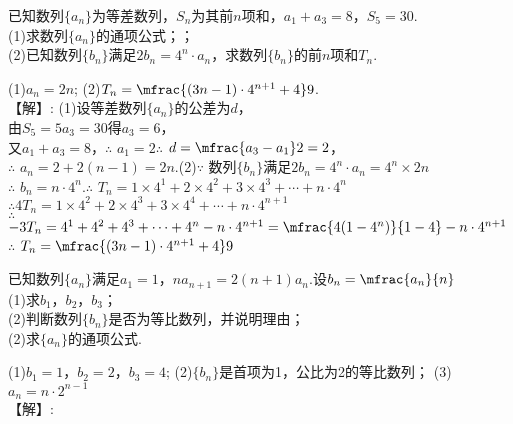 \begin{exercise}
\begin{multicols}{2}
    \end{multicols}
    \clearpage
    \item %
      已知数列$\{a_n\}$为等差数列，$S_n$为其前$n$项和，$a_1+a_3=8$，$S_5=30$.\\
      (1)求数列$\{a_n\}$的通项公式；；\\
      (2)已知数列$\{b_n\}$满足$2b_n=4^n\cdot a_n$，求数列$\{b_n\}$的前$n$项和$T_n$.
      \begin{answer}
        (1)$a_n=2n$;
        (2)$T_n=\mfrac{(3n-1)\cdot4^{n+1}+4}9$.
        \\【解】:
        (1)设等差数列$\{a_n\}$的公差为$d$，\\
           由$S_5=5a_3=30$得$a_3=6$，\\
           又$a_1+a_3=8$，$\therefore$ $a_1=2$\fz[3]
           $\therefore$ $d=\mfrac{a_3-a_1}2=2$，\\
           $\therefore$ $a_n=2+2(n-1)=2n$.\fz[6]
        (2)$\because$ 数列$\{b_n\}$满足$2b_n=4^n\cdot a_n=4^n\times2n$\\
           $\therefore$ $b_n=n\cdot 4^n$.\fz[8]
           $\therefore$ $T_n=1\times4^1+2\times4^2+3\times4^3+\cdots+n\cdot4^n$\\
            $\therefore$$4T_n=1\times4^2+2\times4^3+3\times4^4+\cdots+n\cdot4^{n+1}$\\
           $\therefore$ $-3T_n=4^1+4^2+4^3+\cdots+4^n-n\cdot4^{n+1}=\mfrac{4(1-4^n)}{1-4}-n\cdot4^{n+1}$\fz[10]
           $\therefore$ $T_n=\mfrac{(3n-1)\cdot4^{n+1}+4}9$\fzn[12]
      \end{answer}
    \vspace{14em}
    \item %
      已知数列$\{a_n\}$满足$a_1=1$，$na_{n+1}=2(n+1)a_n$.设$b_n=\mfrac{a_n}{n}$\\
      (1)求$b_1$，$b_2$，$b_3$；\\
      (2)判断数列$\{b_n\}$是否为等比数列，并说明理由；\\
      (2)求$\{a_n\}$的通项公式.
      \begin{answer}
        (1)$b_1=1$，$b_2=2$，$b_3=4$;
        (2)$\{b_n\}$是首项为1，公比为2的等比数列；
        (3)$a_n=n\cdot 2^{n-1}$
        \\【解】:

\end{answer}
\end{exercise}
